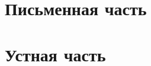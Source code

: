 \documentclass[12pt]{article}
\begin{document}
  \section{Письменная часть}
  
   \newpage
   \newpage
   \newpage
   \newpage
   \newpage
   \newpage
   \newpage
   \newpage
   \newpage
   \newpage

  \newpage

  \section{Устная часть}
   \newpage
   \newpage
   \newpage
   \newpage
   \newpage
  
\end{document}
